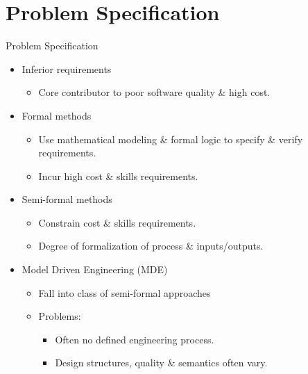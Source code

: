 \section{Problem Specification}

\begin{frame}{Problem Specification}
\initclock

  \begin{itemize}
    \item<+-| alert@+> Inferior requirements
      \begin{itemize}
      	\item Core contributor to poor software quality \& high cost.
      \end{itemize}
    \item<+-| alert@+> Formal methods
      \begin{itemize}
	      \item Use mathematical modeling \& formal logic to specify \& verify requirements.
    	  \item Incur high cost \& skills requirements.
      \end{itemize}
    \item<+-| alert@+> Semi-formal methods
      \begin{itemize}
		\item Constrain cost \& skills requirements.
		\item Degree of formalization of process \& inputs/outputs.
	  \end{itemize}
   \item<+-| alert@+> Model Driven Engineering (MDE)
   	  \begin{itemize}
   	  	\item Fall into class of semi-formal approaches
		  \item Problems:
			 \begin{itemize}
			 \item Often no defined engineering process.
			 \item Design structures, quality \& semantics often vary.
		  \end{itemize}
	  \end{itemize}
  \end{itemize}

\end{frame}


